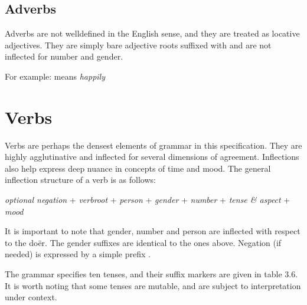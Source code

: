 \documentclass[14pt,oneside]{book}
\let\b\undefined
\newcommand{\b}[1]{{\brahmifont #1}}
\begin{document}
\subsection{Adverbs}

Adverbs are not well{\textendash}defined in the English sense, and they are treated as locative adjectives. They are simply bare adjective roots suffixed with \b{𑀏} and are not inflected for number and gender.


For example: \b{𑀫𑁄𑀤𑀢𑁂} means \textit{happily}




\section{Verbs}

Verbs are perhaps the densest elements of grammar in this specification. They are highly agglutinative and inflected for several dimensions of agreement. Inflections also help express deep nuance in concepts of time and mood. The general inflection structure of a verb is as follows:

\begin{center}
    
    \textit{optional negation} + \textit{verb{\textendash}root} + \textit{person} + \textit{gender} + \textit{number} + \textit{tense \& aspect} + \textit{mood}

\end{center}


It is important to note that gender, number and person are inflected with respect to the doër. The gender suffixes are identical to the ones above. Negation (if needed) is expressed by a simple prefix \b{𑀦}. 

The grammar specifies ten tenses, and their suffix markers are given in table 3.6. It is worth noting that some tenses are mutable, and are subject to interpretation under context.
\end{document}
